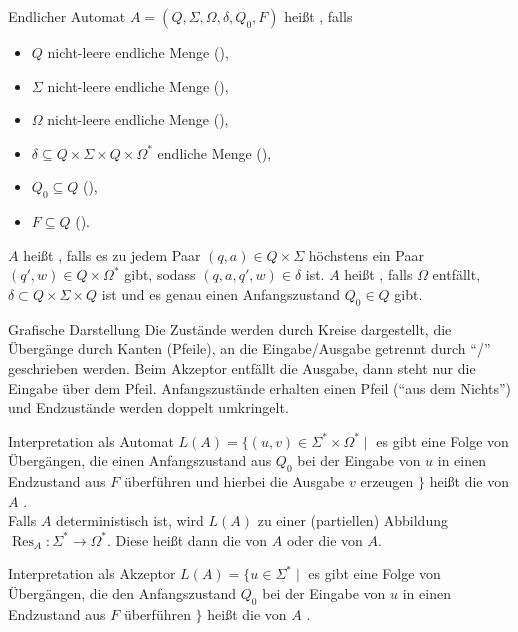 \begin{Def}{Endlicher Automat}
    $A = (Q, \Sigma, \Omega, \delta, Q_0, F)$ heißt
    , falls
    \begin{itemize}
        \item $Q$ nicht-leere endliche Menge (),
        \item $\Sigma$ nicht-leere endliche Menge (),
        \item $\Omega$ nicht-leere endliche Menge (),
        \item $\delta \subseteq Q \times \Sigma \times Q \times \Omega^\ast$
        endliche Menge (),
        \item $Q_0 \subseteq Q$ (),
        \item $F \subseteq Q$ ().
    \end{itemize}
    $A$ heißt , falls es zu jedem Paar
    $(q,a) \in Q \times \Sigma$ höchstens ein Paar
    $(q',w) \in Q \times \Omega^\ast$ gibt, sodass
    $(q,a,q',w) \in \delta$ ist.
    $A$ heißt , falls $\Omega$ entfällt,
    $\delta \subset Q \times \Sigma \times Q$ ist und es genau einen
    Anfangszustand $Q_0 \in Q$ gibt.
\end{Def}

\begin{Def}{Grafische Darstellung}
    Die Zustände werden durch Kreise dargestellt, die Übergänge durch Kanten
    (Pfeile), an die Eingabe/Ausgabe getrennt durch "`/"' geschrieben werden.
    Beim Akzeptor entfällt die Ausgabe, dann steht nur die Eingabe über dem
    Pfeil.
    Anfangszustände erhalten einen Pfeil ("`aus dem Nichts"') und
    Endzustände werden doppelt umkringelt.
\end{Def}

\begin{Def}{Interpretation als Automat}
    $L(A) = \{(u,v) \in \Sigma^\ast \times \Omega^\ast \;|\;$
    es gibt eine Folge von Übergängen, die einen Anfangszustand aus
    $Q_0$ bei der Eingabe von $u$ in einen Endzustand aus $F$
    überführen und hierbei die Ausgabe $v$ erzeugen $\}$ heißt die
    von $A$ . \\
    Falls $A$ deterministisch ist, wird $L(A)$ zu einer (partiellen)
    Abbildung $\operatorname{Res}_A: \Sigma^\ast \rightarrow \Omega^\ast$.
    Diese heißt dann die von $A$  oder die
     von $A$.
\end{Def}

\begin{Def}{Interpretation als Akzeptor}
    $L(A) = \{u \in \Sigma^\ast \;|\;$
    es gibt eine Folge von Übergängen, die den Anfangszustand
    $Q_0$ bei der Eingabe von $u$ in einen Endzustand aus $F$
    überführen $\}$ heißt die von $A$ .
\end{Def}

\pagebreak
